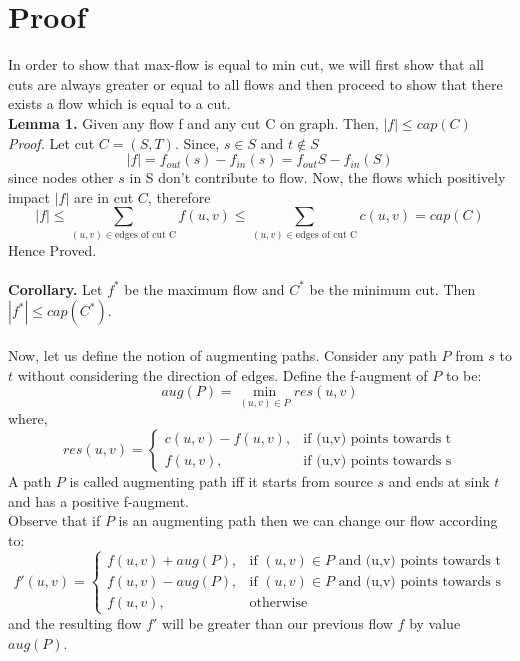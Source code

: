 \documentclass{article}
\begin{document}
\section{Proof}
    In order to show that max-flow is equal to min cut, we will first show that all cuts are always greater or equal to all
    flows and then proceed to show that there exists a flow which is equal to a cut.\\
    \textbf{Lemma 1.} Given any flow f and any cut C on graph. Then, $|f| \leq cap(C)$\\
    \textit{Proof.} Let cut $C = (S,T)$. Since, $s \in S$ and $t \notin S$\\
    $$|f| = f_{out}(s) - f_{in}(s) = f_{out}{S} - f_{in}(S)$$
    since nodes other $s$ in S don't contribute to flow. Now, the flows which positively impact $|f|$ are in cut $C$, therefore
    $$|f| \leq \sum_{(u,v)\in\text{edges of cut C}}f(u,v) \leq \sum_{(u,v)\in\text{edges of cut C}}c(u,v) = cap(C)$$
    Hence Proved.\\\\
    \textbf{Corollary.} Let $f^*$ be the maximum flow and $C^*$ be the minimum cut. Then $|f^*| \leq cap(C^*)$.
    \\\\
    Now, let us define the notion of augmenting paths. Consider any path $P$ from $s$ to $t$ without considering the direction
    of edges. Define the f-augment of $P$ to be:
    $$aug(P) = \min_{(u,v)\in P} res(u,v)$$
    where,
    $$res(u,v) = \begin{cases} c(u,v) - f(u,v), &\text{if (u,v) points towards t}\\
    f(u,v), &\text{if (u,v) points towards s} \end{cases}$$
    A path $P$ is called augmenting path iff it starts from source $s$ and ends at sink $t$ and has a positive f-augment.\\
    Observe that if $P$ is an augmenting path then we can change our flow according to:
    $$ f'(u,v) = \begin{cases} f(u,v)+aug(P), &\text{if }(u,v)\in P\text{ and (u,v) points towards t}\\
                                f(u,v)-aug(P), &\text{if }(u,v)\in P\text{ and (u,v) points towards s}\\
                                f(u,v),&\text{otherwise}
    \end{cases}$$
    and the resulting flow $f'$ will be greater than our previous flow $f$ by value $aug(P)$.\\\\
\end{document}
